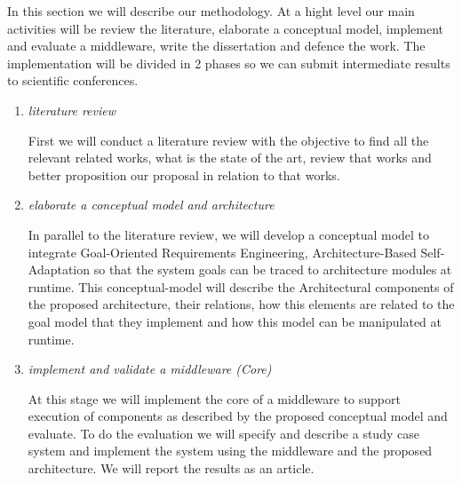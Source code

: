 In this section we will describe our methodology. At a hight level our main activities will be review the literature, elaborate a conceptual model, implement and evaluate a middleware, write the dissertation and defence the work.
The implementation will be divided in 2 phases so we can submit intermediate results to scientific conferences.

\begin{enumerate}

\item \emph{literature review}

First we will conduct a literature review with the objective to find all the relevant related works, what is the state of the art, review that works and better proposition our proposal in relation to that works.

\item \emph{elaborate a conceptual model and architecture}

In parallel to the literature review, we will develop a conceptual model to integrate Goal-Oriented Requirements Engineering, Architecture-Based Self-Adaptation so that the system goals can be traced to architecture modules at runtime. This conceptual-model will describe the Architectural components of the proposed architecture, their relations, how this elements are related to the goal model that they implement and how this model can be manipulated at runtime.


\item \emph{implement and validate a middleware (Core)}

At this stage we will implement the core of a middleware to support execution of components as described by the proposed conceptual model and evaluate. To do the evaluation we will specify and describe a study case system and implement the system using the middleware and the proposed architecture. We will report the results as an article.






\end{enumerate}
